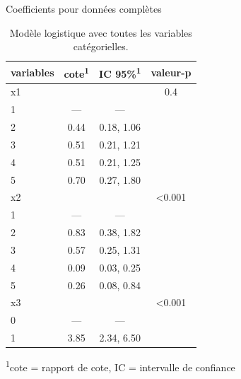 \documentclass[
  ignorenonframetext,
]{beamer}
\begin{document}
\begin{frame}{Coefficients pour données complètes}
\protect\hypertarget{coefficients-pour-donnuxe9es-compluxe8tes}{}
\footnotesize

\hypertarget{tbl-logit1-complet}{}
\setlength{\LTpost}{0mm}
\begin{longtable}{lccc}
\caption{\label{tbl-logit1-complet}Modèle logistique avec toutes les variables catégorielles. }\tabularnewline

\toprule
variables & cote\textsuperscript{1} & IC 95\%\textsuperscript{1} & valeur-p \\ 
\midrule
x1 &  &  & 0.4 \\ 
1 & — & — &  \\ 
2 & 0.44 & 0.18, 1.06 &  \\ 
3 & 0.51 & 0.21, 1.21 &  \\ 
4 & 0.51 & 0.21, 1.25 &  \\ 
5 & 0.70 & 0.27, 1.80 &  \\ 
x2 &  &  & <0.001 \\ 
1 & — & — &  \\ 
2 & 0.83 & 0.38, 1.82 &  \\ 
3 & 0.57 & 0.25, 1.31 &  \\ 
4 & 0.09 & 0.03, 0.25 &  \\ 
5 & 0.26 & 0.08, 0.84 &  \\ 
x3 &  &  & <0.001 \\ 
0 & — & — &  \\ 
1 & 3.85 & 2.34, 6.50 &  \\ 
\bottomrule
\end{longtable}
\begin{minipage}{\linewidth}
\textsuperscript{1}cote = rapport de cote, IC = intervalle de confiance\\
\end{minipage}

\normalsize
\end{frame}
\end{document}
